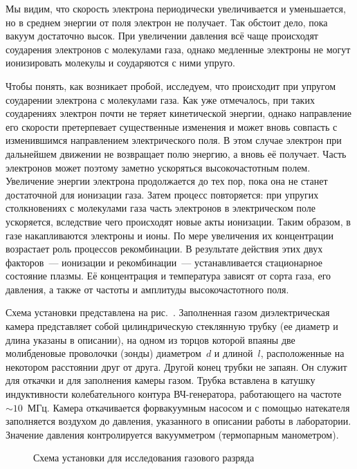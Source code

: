 Мы видим, что скорость электрона периодически увеличивается и уменьшается, но в
среднем энергии от поля электрон не
получает. Так обстоит дело, пока вакуум достаточно высок. При увеличении
давления всё чаще происходят соударения
электронов с молекулами газа, однако медленные электроны не могут ионизировать
молекулы и соударяются с ними упруго.

Чтобы понять, как возникает пробой, исследуем, что происходит при упругом
соударении электрона с молекулами газа. Как уже отмечалось, при таких
соударениях электрон почти не теряет кинетической энергии, однако направление
его скорости претерпевает существенные изменения и может вновь совпасть с
изменившимся направлением электрического поля. В этом случае электрон при
дальнейшем движении не возвращает полю энергию, а вновь её получает. Часть
электронов может поэтому заметно ускоряться высокочастотным полем. Увеличение
энергии электрона продолжается до тех пор, пока она не станет достаточной для
ионизации газа. Затем процесс повторяется: при упругих столкновениях с
молекулами газа часть электронов
в электрическом поле ускоряется, вследствие чего происходят новые акты
ионизации. Таким образом, в газе накапливаются электроны и ионы. По мере
увеличения их концентрации возрастает роль процессов рекомбинации. В результате
действия этих двух факторов~--- ионизации и рекомбинации~---
устанавливается стационарное состояние плазмы.
Её концентрация и температура зависят от сорта газа, его давления,
а также от частоты и амплитуды высокочастотного поля.

\experiment
Схема установки представлена на рис.~.
Заполненная газом диэлектрическая камера представляет собой цилиндрическую
стеклянную трубку (ее диаметр и длина указаны в описании), на одном из торцов
которой впаяны две молибденовые проволочки (зонды)
диаметром~$d$ и длиной~$l$, расположенные на некотором расстоянии друг от друга.
Другой конец трубки не запаян.
Он служит для откачки и для заполнения камеры газом. Трубка вставлена в катушку
индуктивности колебательного контура
ВЧ-генератора, работающего на частоте~$\sim10$~МГц. Камера откачивается
форвакуумным насосом и с помощью натекателя
заполняется воздухом до давления, указанного в описании работы в лаборатории.
Значение давления контролируется вакуумметром
(термопарным манометром).

\begin{figure}[h!]
    \centering
    \footnotesize
	\caption{Схема установки для исследования газового разряда}
\end{figure}


